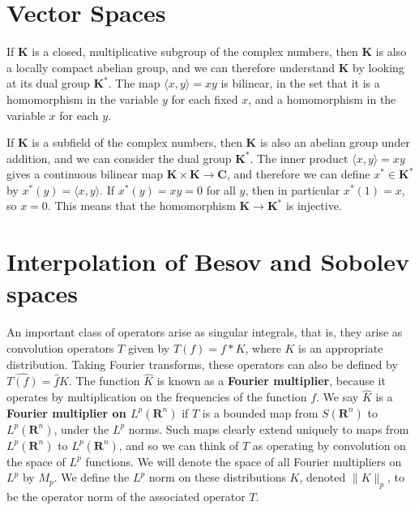 \chapter{Vector Spaces}

If $\mathbf{K}$ is a closed, multiplicative subgroup of the complex numbers, then $\mathbf{K}$ is also a locally compact abelian group, and we can therefore understand $\mathbf{K}$ by looking at its dual group $\mathbf{K}^*$. The map $\langle x,y \rangle = xy$ is bilinear, in the set that it is a homomorphism in the variable $y$ for each fixed $x$, and a homomorphism in the variable $x$ for each $y$.

If $\mathbf{K}$ is a subfield of the complex numbers, then $\mathbf{K}$ is also an abelian group under addition, and we can consider the dual group $\mathbf{K}^*$. The inner product $\langle x, y \rangle = xy$ gives a continuous bilinear map $\mathbf{K} \times \mathbf{K} \to \mathbf{C}$, and therefore we can define $x^* \in \mathbf{K}^*$ by $x^*(y) = \langle x,y \rangle$. If $x^*(y) = xy = 0$ for all $y$, then in particular $x^*(1) = x$, so $x = 0$. This means that the homomorphism $\mathbf{K} \to \mathbf{K}^*$ is injective.

\chapter{Interpolation of Besov and Sobolev spaces}

An important class of operators arise as singular integrals, that is, they arise as convolution operators $T$ given by $T(f) = f * K$, where $K$ is an appropriate distribution. Taking Fourier transforms, these operators can also be defined by $\widehat{T(f)} = \widehat{f} \widehat{K}$. The function $\widehat{K}$ is known as a {\bf Fourier multiplier}, because it operates by multiplication on the frequencies of the function $f$. We say $\widehat{K}$ is a {\bf Fourier multiplier on $L^p(\mathbf{R}^n)$} if $T$ is a bounded map from $S(\mathbf{R}^n)$ to $L^p(\mathbf{R}^n)$, under the $L^p$ norms. Such maps clearly extend uniquely to maps from $L^p(\mathbf{R}^n)$ to $L^p(\mathbf{R}^n)$, and so we can think of $T$ as operating by convolution on the space of $L^p$ functions. We will denote the space of all Fourier multipliers on $L^p$ by $M_p$. We define the $L^p$ norm on these distributions $K$, denoted $\| K \|_p$, to be the operator norm of the associated operator $T$.

